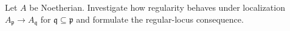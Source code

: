 \begin{problem}
Let $A$ be Noetherian. Investigate how regularity behaves under localization $A_{\mathfrak p}\to A_{\mathfrak q}$ for $\mathfrak q\subseteq\mathfrak p$ and formulate the regular-locus consequence.
\end{problem}
